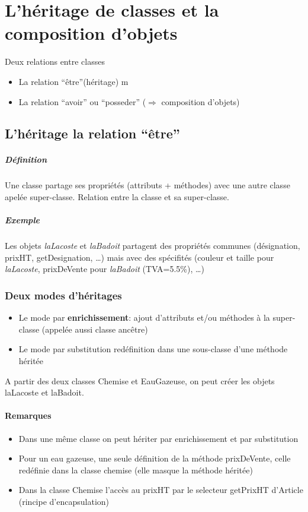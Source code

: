 \chapter{L'héritage de classes et la composition d'objets}
Deux relations entre classes
\begin{itemize}
	\item La relation ``être''(héritage)
m	\item La relation ``avoir'' ou ``posseder'' ($\Rightarrow$ composition d'objets)
\end{itemize}
\section{L'héritage la relation ``être''}
	\paragraph{Définition} Une classe partage ses propriétés (attributs + méthodes) 
	avec une autre classe apelée super-classe. Relation entre la classe et 
	sa super-classe.
	\paragraph{Exemple} Les objets \textit{laLacoste} et \textit{laBadoit} partagent des propriétés communes
	(désignation, prixHT, getDesignation, \ldots) mais avec des spécifités 
	(couleur et taille pour \textit{laLacoste}, prixDeVente pour \textit{laBadoit} (TVA=5.5\%), \ldots) 
	\subsection{Deux modes d'héritages}
	\begin{itemize}
		\item Le mode par \textbf{enrichissement}: ajout d'attributs et/ou méthodes à la 
			super-classe (appelée aussi classe ancêtre)
			
		\newpage
		\item Le mode par substitution redéfinition dans une sous-classe d'une méthode héritée 
			
	\end{itemize}
	A partir des deux classes Chemise et EauGazeuse, on peut créer les objets 
	laLacoste et laBadoit.
		
	\subsubsection{Remarques}
	\begin{itemize}
		\item Dans une même classe on peut hériter par enrichissement et par 
			substitution
		\item Pour un eau gazeuse, une seule définition de la méthode prixDeVente, 
			celle redéfinie dans la classe chemise (elle masque la méthode héritée)
		\item Dans la classe Chemise l'accès au prixHT par le selecteur getPrixHT 
			d'Article (rincipe d'encapsulation)
	\end{itemize}
